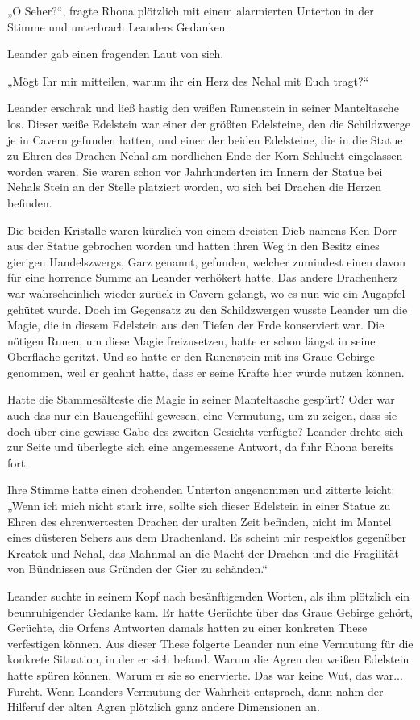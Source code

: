 „O Seher?“, fragte Rhona plötzlich mit einem alarmierten Unterton in der Stimme und unterbrach Leanders Gedanken.

Leander gab einen fragenden Laut von sich.

„Mögt Ihr mir mitteilen, warum ihr ein Herz des Nehal mit Euch tragt?“

Leander erschrak und ließ hastig den weißen Runenstein in seiner Manteltasche los. Dieser weiße Edelstein war einer der größten Edelsteine, den die Schildzwerge je in Cavern gefunden hatten, und einer der beiden Edelsteine, die in die Statue zu Ehren des Drachen Nehal am nördlichen Ende der Korn-Schlucht eingelassen worden waren. Sie waren schon vor Jahrhunderten im Innern der Statue bei Nehals Stein an der Stelle platziert worden, wo sich bei Drachen die Herzen befinden.

Die beiden Kristalle waren kürzlich von einem dreisten Dieb namens Ken Dorr aus der Statue gebrochen worden und hatten ihren Weg in den Besitz eines gierigen Handelszwergs, Garz genannt, gefunden, welcher zumindest einen davon für eine horrende Summe an Leander verhökert hatte. Das andere Drachenherz war wahrscheinlich wieder zurück in Cavern gelangt, wo es nun wie ein Augapfel gehütet wurde. Doch im Gegensatz zu den Schildzwergen wusste Leander um die Magie, die in diesem Edelstein aus den Tiefen der Erde konserviert war. Die nötigen Runen, um diese Magie freizusetzen, hatte er schon längst in seine Oberfläche geritzt. Und so hatte er den Runenstein mit ins Graue Gebirge genommen, weil er geahnt hatte, dass er seine Kräfte hier würde nutzen können.

Hatte die Stammesälteste die Magie in seiner Manteltasche gespürt? Oder war auch das nur ein Bauchgefühl gewesen, eine Vermutung, um zu zeigen, dass sie doch über eine gewisse Gabe des zweiten Gesichts verfügte? Leander drehte sich zur Seite und überlegte sich eine angemessene Antwort, da fuhr Rhona bereits fort.

Ihre Stimme hatte einen drohenden Unterton angenommen und zitterte leicht: „Wenn ich mich nicht stark irre, sollte sich dieser Edelstein in einer Statue zu Ehren des ehrenwertesten Drachen der uralten Zeit befinden, nicht im Mantel eines düsteren Sehers aus dem Drachenland. Es scheint mir respektlos gegenüber Kreatok und Nehal, das Mahnmal an die Macht der Drachen und die Fragilität von Bündnissen aus Gründen der Gier zu schänden.“

Leander suchte in seinem Kopf nach besänftigenden Worten, als ihm plötzlich ein beunruhigender Gedanke kam. Er hatte Gerüchte über das Graue Gebirge gehört, Gerüchte, die Orfens Antworten damals hatten zu einer konkreten These verfestigen können. Aus dieser These folgerte Leander nun eine Vermutung für die konkrete Situation, in der er sich befand. Warum die Agren den weißen Edelstein hatte spüren können. Warum er sie so enervierte. Das war keine Wut, das war... Furcht. Wenn Leanders Vermutung der Wahrheit entsprach, dann nahm der Hilferuf der alten Agren plötzlich ganz andere Dimensionen an.

